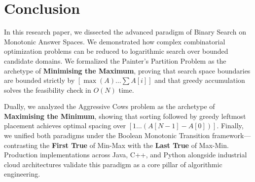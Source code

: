 \documentclass[10pt,journal,compsoc,onecolumn]{IEEEtran}
\begin{document}
\section{Conclusion}
\label{sec:conclusion}

In this research paper, we dissected the advanced paradigm of Binary Search on Monotonic Answer Spaces. We demonstrated how complex combinatorial optimization problems can be reduced to logarithmic search over bounded candidate domains. We formalized the Painter's Partition Problem as the archetype of \textbf{Minimising the Maximum}, proving that search space boundaries are bounded strictly by $[\max(A) \dots \sum A[i]]$ and that greedy accumulation solves the feasibility check in $O(N)$ time.

Dually, we analyzed the Aggressive Cows problem as the archetype of \textbf{Maximising the Minimum}, showing that sorting followed by greedy leftmost placement achieves optimal spacing over $[1 \dots (A[N-1] - A[0])]$. Finally, we unified both paradigms under the Boolean Monotonic Transition framework—contrasting the \textbf{First True} of Min-Max with the \textbf{Last True} of Max-Min. Production implementations across Java, C++, and Python alongside industrial cloud architectures validate this paradigm as a core pillar of algorithmic engineering.
\end{document}
